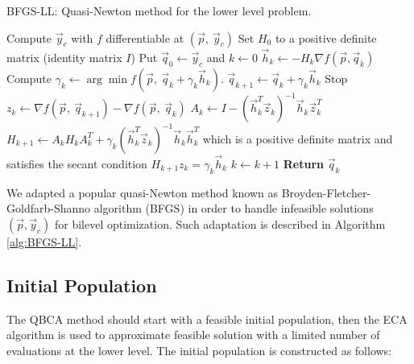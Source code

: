 \documentclass[conference]{IEEEtran}
\theoremstyle{definition}
\begin{document}
\begin{algorithm}[htbp]
    \caption{BFGS-LL: Quasi-Newton method for the lower level problem.}
    \label{alg:BFGS-LL}
    \begin{algorithmic}[1]
        \STATE Compute $\vec{y}_c$ with $f$ differentiable at $(\vec{p},\ \vec{y}_c)$
        \STATE Set $H_0$ to a positive definite matrix (identity matrix $I$)
        \STATE Put $\vec{q}_0 \gets \vec{y}_c$ and $k \gets 0$
            \STATE $\vec{h}_k \gets -H_k\nabla f(\vec{p}, \vec{q}_k)$
            \STATE Compute $\gamma_{k}\gets\arg \min f(\vec{p}, \ \vec{q} _{k}+ \gamma_k \vec{h} _{k})$.
            \STATE $\vec{q}_{k+1} \gets \vec{q}_k  + \gamma_k \vec{h}_k$
                \STATE Stop
            \ENDIF
            \STATE $z_k \gets \nabla f(\vec{p}, \ \vec{q}_{k+1}) - \nabla f(\vec{p}, \ \vec{q}_{k}) $
            \STATE $\displaystyle A_k \gets I - (\vec{h}_k^T \vec{z}_k)^{-1} \vec{h}_k \vec{z}_k^T$
            \STATE $H_{k+1} \gets A_k H_k A_k^T + \gamma_k(\vec{h}_k^T\vec{z}_k)^{-1}\vec{h}_k \vec{h}_k^T$
                   which is a positive definite matrix and satisfies the secant
                   condition $H_{k+1} z_k = \gamma_k \vec{h}_k$
            \STATE $k \gets k + 1$
        \ENDWHILE
        \STATE \textbf{Return} $\vec{q}_k$
    \end{algorithmic}
\end{algorithm}

We adapted a popular quasi-Newton method known as Broyden-Fletcher-Goldfarb-Shanno
algorithm (BFGS) \cite{fletcher2013practical} in order to handle infeasible
solutions $(\vec{p}, \vec{y}_c)$ for bilevel optimization. Such adaptation is
described in Algorithm \ref{alg:BFGS-LL}.
% 

\subsection{Initial Population} %
\label{sub:initial_population}


The QBCA method should start with a feasible initial population, then the ECA
algorithm \cite{Mejia2018} is used to approximate feasible solution with a limited
number of evaluations at the lower level. The initial population is constructed
as follows:
\end{document}
